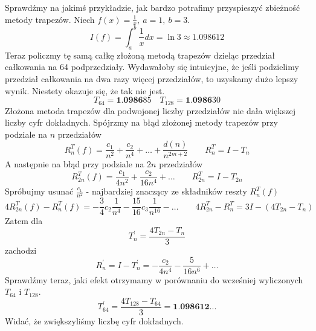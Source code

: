 \documentclass{article}
\begin{document}
Sprawdźmy na jakimś przykładzie, jak bardzo potrafimy przyspieszyć zbieżność metody trapezów. Niech $f(x) = \frac{1}{x},\ a = 1,\ b = 3$.
\begin{equation*}
	I(f) = \int_a^b \frac{1}{x} dx = \ln 3 \approx 1.098612
\end{equation*}
Teraz policzmy tę samą całkę złożoną metodą trapezów dzieląc przedział całkowania na 64 podprzedziały.
Wydawałoby się intuicyjne, że jeśli podzielimy przedział całkowania na dwa razy więcej przedziałów,
to uzyskamy dużo lepszy wynik. Niestety okazuje się, że tak nie jest.
\begin{equation*}
	T_{64} = \textbf{1.0986}85 \quad T_{128} = \textbf{1.0986}30
\end{equation*}
Złożona metoda trapezów dla podwojonej liczby przedziałów nie dała większej liczby cyfr dokładnych.
Spójrzmy na błąd złożonej metody trapezów przy podziale na $n$ przedziałów
\begin{equation*}
	R_n^T(f) = \frac{c_1}{n^2} + \frac{c_2}{n^4} + \ldots + \frac{d(n)}{n^{2m + 2}} \quad\quad R_n^T = I - T_n
\end{equation*}
A następnie na błąd przy podziale na $2n$ przedziałów
\begin{equation*}
	R_{2n}^T(f) = \frac{c_1}{4n^2} + \frac{c_2}{16n^4} + \ldots  \quad\quad R_{2n}^T = I - T_{2n}
\end{equation*}
Spróbujmy usunać $\frac{c_1}{n^2}$ - najbardziej znaczący ze składników reszty $R_n^T(f)$
\begin{equation*}
	4R_{2n}^T(f) - R_n^T(f) = -\frac{3}{4} c_2 \frac{1}{n^4} - \frac{15}{16} c_3 \frac{1}{n^{16}} - \ldots \quad\quad 4R_{2n}^T - R_n^T = 3I - (4T_{2n} - T_n)
\end{equation*}
Zatem dla
\begin{equation*}
	T_n^\prime = \frac{4T_{2n} - T_n}{3}
\end{equation*}
zachodzi
\begin{equation*}
	R_n^\prime = I - T_n^\prime = - \frac{c_2}{4n^4} - \frac{5}{16n^6} + \ldots
\end{equation*}
Sprawdźmy teraz, jaki efekt otrzymamy w porównaniu do wcześniej wyliczonych $T_{64}$ i $T_{128}$.
\begin{equation*}
	T_{64}^\prime = \frac{4T_{128} - T_{64}}{3} = \textbf{1.098612}...
\end{equation*}
Widać, że zwiększyliśmy liczbę cyfr dokładnych.
\end{document}
